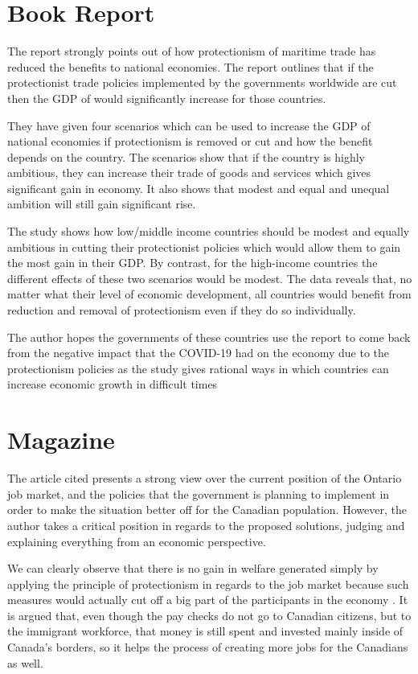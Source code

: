 \documentclass [11pt]{article}
\begin{document}
\section{Book Report}

The report strongly points out of how protectionism of maritime trade has reduced the benefits to national economies. The report outlines that if the protectionist trade policies implemented by the governments worldwide are cut then the GDP of would significantly increase for those countries.  
\parencite{CraigVang2021PiMES}

They have given four scenarios which can be used to increase the GDP of national economies if protectionism is removed or cut and how the benefit depends on the country. The scenarios show that if the country is highly ambitious, they can increase their trade of goods and services which gives significant gain in economy. It also shows that modest and equal and unequal ambition will still gain significant rise. 

The study shows how low/middle income countries should be modest and equally ambitious in cutting their protectionist policies which would allow them to gain the most gain in their GDP. By contrast, for the high-income countries the different effects of these two scenarios would be modest. The data reveals that, no matter what their level of economic development, all countries would benefit from reduction and removal of protectionism even if they do so individually. 

The author hopes the governments of these countries use the report to come back from the negative impact that the COVID-19 had on the economy due to the protectionism policies as the study gives rational ways in which countries can increase economic growth in difficult times 

\section{Magazine}

The article cited presents a strong view over the current position of the Ontario job market, and the policies that the government is planning to implement in order to make the situation better off for the Canadian population. However, the author takes a critical position in regards to the proposed solutions, judging and explaining everything from an economic perspective. 

We can clearly observe that there is no gain in welfare generated simply by applying the principle of protectionism in regards to the job market because such measures would actually cut off a big part of the participants in the economy \parencite{MatthewLau2020Adep}. It is argued that, even though the pay checks do not go to Canadian citizens, but to the immigrant workforce, that money is still spent and invested mainly inside of Canada’s borders, so it helps the process of creating more jobs for the Canadians as well. 
\end{document}
